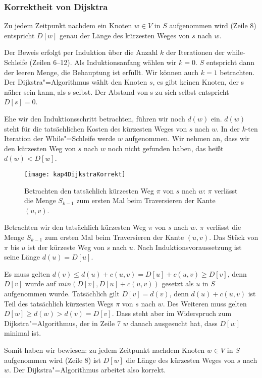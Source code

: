 \subsubsection{Korrektheit von Dijsktra}
\begin{Beh}
  \hspace{\parindent}Zu jedem Zeitpunkt nachdem ein Knoten $w \in V$ in $S$ aufgenommen wird (Zeile 8) entspricht $D[w]$ genau der Länge des kürzesten Weges von $s$ nach $w$.
\end{Beh}

\begin{Bew}
  \hspace{\parindent}Der Beweis erfolgt per Induktion über die Anzahl $k$ der Iterationen der while-Schleife (Zeilen 6--12). Als Induktionsanfang wählen wir $k=0$. $S$ entspricht dann der leeren Menge, die Behauptung ist erfüllt. Wir können auch $k=1$ betrachten. Der Dijkstra"=Algorithmus wählt den Knoten $s$, es gibt keinen Knoten, der s näher sein kann, als s selbst. Der Abstand von s zu sich selbst entspricht $D[s] = 0$.
  
  Ehe wir den Induktionsschritt betrachten, führen wir noch $d(w)$ ein. $d(w)$ steht für die tatsächlichen Kosten des kürzesten Weges von $s$ nach $w$. In der $k$-ten Iteration der While"=Schleife werde $w$ aufgenommen. Wir nehmen an, dass wir den kürzesten Weg von $s$ nach $w$ noch nicht gefunden haben, das heißt $d(w) < D[w]$.
  
  \begin{figure}[htb]
    \centering
    \texttt{[image: kap4DijkstraKorrekt]}
    \caption{Betrachten den tatsächlich kürzesten Weg $\pi$ von $s$ nach $w$: $\pi$ verlässt die Menge $S_{k-1}$ zum ersten Mal beim Traversieren der Kante $(u, v)$.}
    \label{kap4DijkstraKorrekt}
  \end{figure}
  
  Betrachten wir den tatsächlich kürzesten Weg $\pi$ von $s$ nach $w$. $\pi$ verlässt die Menge $S_{k-1}$ zum ersten Mal beim Traversieren der Kante $(u,v)$. Das Stück von $\pi$ bis $u$ ist der kürzeste Weg von $s$ nach $u$. Nach Induktionsvoraussetzung ist seine Länge $d(u) = D[u]$.
  
  Es muss gelten $d(v) \le d(u) + c(u,v) = D[u] + c(u,v) \ge D[v]$, denn $D[v]$ wurde auf $min(D[v], D[u] + c(u,v))$ gesetzt als $u$ in $S$ aufgenommen wurde. Tatsächlich gilt $D[v] = d(v)$, denn $d(u) + c(u,v)$ ist Teil des tatsächlich kürzesten Wegs $\pi$ von $s$ nach $w$. Des Weiteren muss gelten $D[w] \ge d(w) > d(v) = D[v]$. Dass steht aber im Widerspruch zum Dijkstra"=Algorithmus, der in Zeile 7 $w$ danach ausgesucht hat, dass $D[w]$ minimal ist.
  
  Somit haben wir bewiesen: zu jedem Zeitpunkt nachdem Knoten $w \in V$ in $S$ aufgenommen wird (Zeile 8) ist $D[w]$ die Länge des kürzesten Weges von $s$ nach $w$. Der Dijkstra"=Algorithmus arbeitet also korrekt.
\end{Bew}

